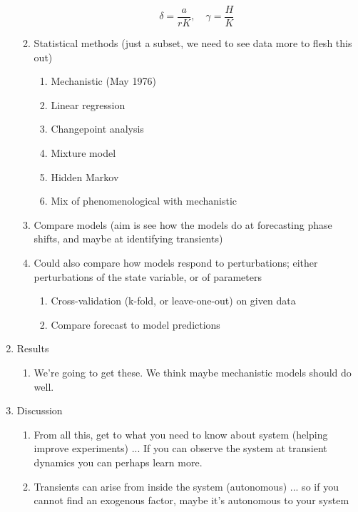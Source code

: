 \documentclass[11pt,letter]{article}
\begin{document}
\begin{enumerate}
\begin{enumerate}
\[ \delta = \frac{a}{rK}, \quad \gamma = \frac{H}{K} \]
\item Statistical methods (just a subset, we need to see data more to flesh this out)
\begin{enumerate}
\item Mechanistic (May 1976) %
\item Linear regression
\item Changepoint analysis
\item Mixture model
\item Hidden Markov %
\item Mix of phenomenological with mechanistic
\end{enumerate}
\item Compare models (aim is see how the models do at forecasting phase shifts, and maybe at identifying transients)
\item Could also compare how models respond to perturbations; either perturbations of the state variable, or of parameters
\begin{enumerate}
\item Cross-validation (k-fold, or leave-one-out) on given data
\item Compare forecast to model predictions
\end{enumerate}
\end{enumerate}
\item Results
\begin{enumerate}
\item We're going to get these. We think maybe mechanistic models should do well.
\end{enumerate}
\item Discussion
\begin{enumerate}
\item From all this, get to what you need to know about system (helping improve experiments)  ... If you can observe the system at transient dynamics you can perhaps learn more. 
\item Transients can arise from inside the system (autonomous) ... so if you cannot find an exogenous factor, maybe it's autonomous to your system
\end{enumerate}
\end{enumerate}
\end{document}
